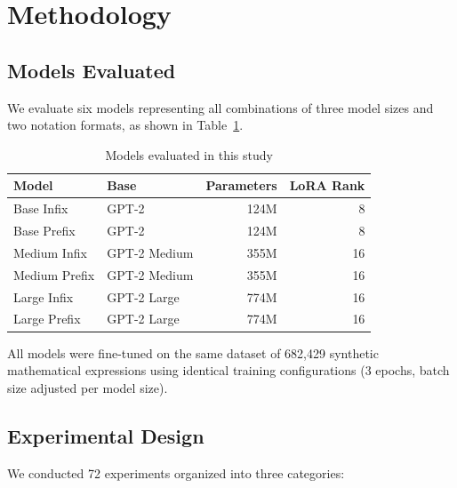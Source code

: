 \documentclass[11pt,a4paper]{article}
\begin{document}
\section{Methodology}

\subsection{Models Evaluated}

We evaluate six models representing all combinations of three model sizes and two notation formats, as shown in Table~\ref{tab:models}.

\begin{table}[H]
\centering
\caption{Models evaluated in this study}
\label{tab:models}
\begin{tabular}{llrr}
\toprule
\textbf{Model} & \textbf{Base} & \textbf{Parameters} & \textbf{LoRA Rank} \\
\midrule
Base Infix & GPT-2 & 124M & 8 \\
Base Prefix & GPT-2 & 124M & 8 \\
Medium Infix & GPT-2 Medium & 355M & 16 \\
Medium Prefix & GPT-2 Medium & 355M & 16 \\
Large Infix & GPT-2 Large & 774M & 16 \\
Large Prefix & GPT-2 Large & 774M & 16 \\
\bottomrule
\end{tabular}
\end{table}

All models were fine-tuned on the same dataset of 682,429 synthetic mathematical expressions using identical training configurations (3 epochs, batch size adjusted per model size).

\subsection{Experimental Design}

We conducted 72 experiments organized into three categories:
\end{document}
